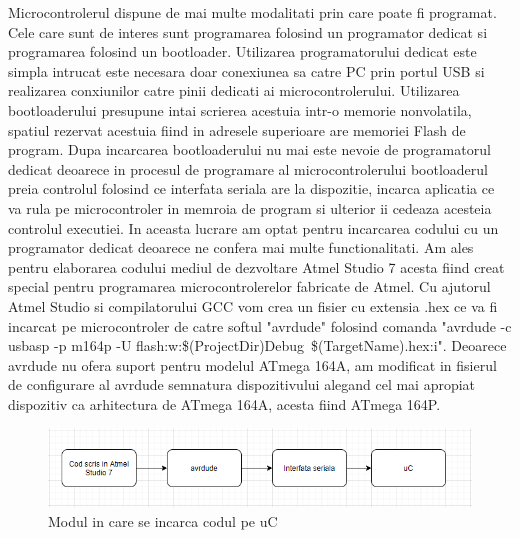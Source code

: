 \documentclass[12pt]{article}
\begin{document}
\hspace{8 mm} Microcontrolerul dispune de mai multe modalitati prin care poate fi programat. Cele care sunt de interes sunt programarea folosind un programator dedicat si programarea folosind un bootloader. Utilizarea programatorului dedicat este simpla intrucat este necesara doar conexiunea sa catre PC prin portul USB si realizarea conxiunilor catre pinii dedicati ai microcontrolerului. Utilizarea bootloaderului presupune intai scrierea acestuia intr-o memorie nonvolatila, spatiul rezervat acestuia fiind in adresele superioare are memoriei Flash de program. Dupa incarcarea bootloaderului nu mai este nevoie de programatorul dedicat deoarece in procesul de programare al microcontrolerului bootloaderul preia controlul folosind ce interfata seriala are la dispozitie, incarca aplicatia ce va rula pe microcontroler in memroia de program si ulterior ii cedeaza acesteia controlul executiei. In aceasta lucrare am optat pentru incarcarea codului cu un programator dedicat deoarece ne confera mai multe functionalitati. Am ales pentru elaborarea codului mediul de dezvoltare Atmel Studio 7 acesta fiind creat special pentru programarea microcontrolerelor fabricate de Atmel. Cu ajutorul Atmel Studio si compilatorului GCC vom crea un fisier cu extensia .hex ce va fi incarcat pe microcontroler de catre softul "avrdude" folosind comanda "avrdude -c usbasp -p m164p -U flash:w:\$(ProjectDir)Debug\ \$(TargetName).hex:i". Deoarece avrdude nu ofera suport pentru modelul ATmega 164A, am modificat in fisierul de configurare al avrdude semnatura dispozitivului alegand cel mai apropiat dispozitiv ca arhitectura de ATmega 164A, acesta fiind ATmega 164P.

\begin{figure}[H]
\centering
\includegraphics[width=\textwidth]{Pictures/avrdudePath.png}
\caption{Modul in care se incarca codul pe uC}
\end{figure}

\vspace{4 mm}
\end{document}
